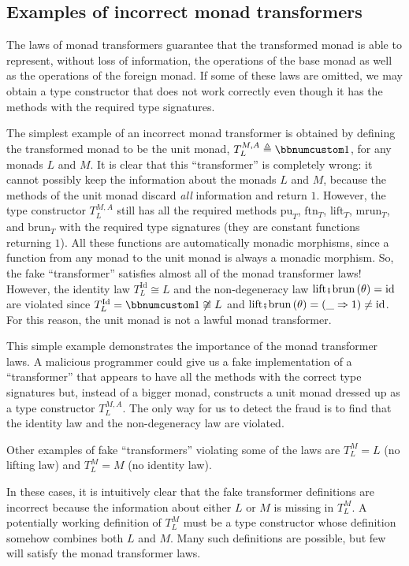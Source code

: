 \subsection{Examples of incorrect monad transformers}

The laws of monad transformers guarantee that the transformed monad
is able to represent, without loss of information, the operations
of the base monad as well as the operations of the foreign monad.
If some of these laws are omitted, we may obtain a type constructor
that does not work correctly even though it has the methods with the
required type signatures.

The simplest example of an incorrect monad transformer is obtained
by defining the transformed monad to be the unit monad, $T_{L}^{M,A}\triangleq\bbnum 1$,
for any monads $L$ and $M$. It is clear that this ``transformer''
is completely wrong: it cannot possibly keep the information about
the monads $L$ and $M$, because the methods of the unit monad discard
\emph{all} information and return $1$. However, the type constructor
$T_{L}^{M,A}$ still has all the required methods $\text{pu}_{T}$,
$\text{ftn}_{T}$, $\text{lift}_{T}$, $\text{mrun}_{T}$, and $\text{brun}_{T}$
with the required type signatures (they are constant functions returning
$1$). All these functions are automatically monadic morphisms, since
a function from any monad to the unit monad is always a monadic morphism.
So, the fake ``transformer'' satisfies almost all of the monad transformer
laws! However, the identity law $T_{L}^{\text{Id}}\cong L$ and the
non-degeneracy law $\text{lift}\bef\text{brun}\left(\theta\right)=\text{id}$
are violated since $T_{L}^{\text{Id}}=\bbnum 1\not\cong L$ and $\text{lift}\bef\text{brun}\left(\theta\right)=\left(\_\Rightarrow1\right)\neq\text{id}$.
For this reason, the unit monad is not a lawful monad transformer.

This simple example demonstrates the importance of the monad transformer
laws. A malicious programmer could give us a fake implementation of
a ``transformer'' that appears to have all the methods with the
correct type signatures but, instead of a bigger monad, constructs
a unit monad dressed up as a type constructor $T_{L}^{M,A}$. The
only way for us to detect the fraud is to find that the identity law
and the non-degeneracy law are violated.

Other examples of fake ``transformers'' violating some of the laws
are $T_{L}^{M}=L$ (no lifting law) and $T_{L}^{M}=M$ (no identity
law).

In these cases, it is intuitively clear that the fake transformer
definitions are incorrect because the information about either $L$
or $M$ is missing in $T_{L}^{M}$. A potentially working definition
of $T_{L}^{M}$ must be a type constructor whose definition somehow
combines both $L$ and $M$. Many such definitions are possible, but
few will satisfy the monad transformer laws.

